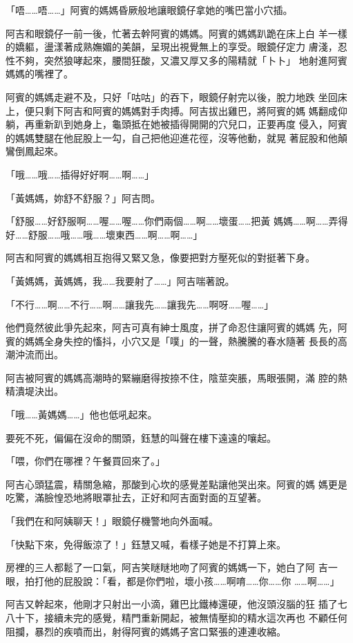 「唔……唔……」阿賓的媽媽昏厥般地讓眼鏡仔拿她的嘴巴當小穴插。

阿吉和眼鏡仔一前一後，忙著去幹阿賓的媽媽。阿賓的媽媽趴跪在床上白
羊一樣的嬌軀，盪漾著成熟嫵媚的美韻，呈現出視覺無上的享受。眼鏡仔定力
膚淺，忍性不夠，突然狼哮起來，腰間狂酸，又濃又厚又多的陽精就「卜卜」
地射進阿賓媽媽的嘴裡了。

阿賓的媽媽走避不及，只好「咕咕」的吞下，眼鏡仔射完以後，脫力地跌
坐回床上，便只剩下阿吉和阿賓的媽媽對手肉搏。阿吉拔出雞巴，將阿賓的媽
媽翻成仰躺，再重新趴到她身上，龜頭抵在她被插得開開的穴兒口，正要再度
侵入，阿賓的媽媽雙腿在他屁股上一勾，自己把他迎進花徑，沒等他動，就晃
著屁股和他顛鸞倒鳳起來。

「哦……哦……插得好好啊……啊……」

「黃媽媽，妳舒不舒服？」阿吉問。

「舒服……好舒服啊……喔……喔……你們兩個……啊……壞蛋……把黃
媽媽……啊……弄得好……舒服……哦……哦……壞東西……啊……啊……」

阿吉和阿賓的媽媽相互抱得又緊又急，像要把對方壓死似的對挺著下身。

「黃媽媽，黃媽媽，我……我要射了……」阿吉喘著說。

「不行……啊……不行……啊……讓我先……讓我先……啊呀……喔……」

他們竟然彼此爭先起來，阿吉可真有紳士風度，拼了命忍住讓阿賓的媽媽
先，阿賓的媽媽全身失控的慉抖，小穴又是「噗」的一聲，熱騰騰的春水隨著
長長的高潮沖流而出。

阿吉被阿賓的媽媽高潮時的緊繃磨得按捺不住，陰莖突脹，馬眼張開，滿
腔的熱精潰堤決出。

「哦……黃媽媽……」他也低吼起來。

要死不死，偏偏在沒命的關頭，鈺慧的叫聲在樓下遠遠的嚷起。

「喂，你們在哪裡？午餐買回來了。」

阿吉心頭猛震，精關急縮，那酸到心坎的感覺差點讓他哭出來。阿賓的媽
媽更是吃驚，滿臉惶恐地將眼罩扯去，正好和阿吉面對面的互望著。

「我們在和阿姨聊天！」眼鏡仔機警地向外面喊。

「快點下來，免得飯涼了！」鈺慧又喊，看樣子她是不打算上來。

房裡的三人都鬆了一口氣，阿吉笑瞇瞇地吻了阿賓的媽媽一下，她白了阿
吉一眼，拍打他的屁股說：「看，都是你們啦，壞小孩……啊唷……你……你
……啊……」

阿吉又幹起來，他剛才只射出一小滴，雞巴比鐵棒還硬，他沒頭沒腦的狂
插了七八十下，接續未完的感覺，精門重新開起，被無情壓抑的精水這次再也
不顧任何阻攔，暴烈的疾噴而出，射得阿賓的媽媽子宮口緊張的連連收縮。

